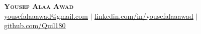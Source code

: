 \documentclass[letterpaper,10pt]{article}
\begin{document}
\begin{center}
    \textbf{\Huge \scshape Yousef Alaa Awad} \\ \vspace{1pt}
    \small \href{mailto:yousefalaaawad@gmail.com}{\underline{yousefalaaawad@gmail.com}} $|$ 
    \href{https://www.linkedin.com/in/yousefalaaawad}{\underline{linkedin.com/in/yousefalaaawad}} $|$
    \href{https://www.github.com/Quil180}{\underline{github.com/Quil180}}
\end{center}






\end{document}
